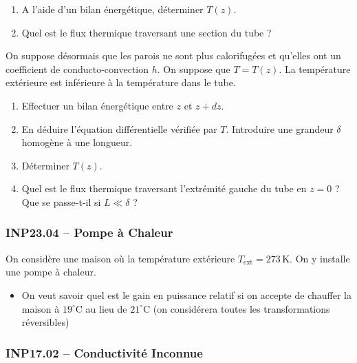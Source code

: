 \begin{enumerate}
\item A l'aide d'un bilan énergétique, déterminer $T(z)$.
\item Quel est le flux thermique traversant une section du tube ?
\end{enumerate}

On suppose désormais que les parois ne sont plus calorifugées et qu'elles ont un coefficient de conducto-convection $h$. On suppose que $T = T(z)$. La température extérieure est inférieure à la température dans le tube.

\begin{enumerate}[resume]
\item Effectuer un bilan énergétique entre $z$ et $z + dz$.
\item En déduire l'équation différentielle vérifiée par $T$. Introduire une grandeur $\delta$ homogène à une longueur.
\item Déterminer $T(z)$.
\item Quel est le flux thermique traversant l'extrémité gauche du tube en $z = 0$ ? Que se passe-t-il si $L \ll \delta$ ?
\end{enumerate}

\newpage
\subsubsection*{INP23.04 -- Pompe à Chaleur }

On considère une maison où la température extérieure $T_{\text{ext}} = 273\,\text{K}$. On y installe une pompe à chaleur.

\begin{itemize}[label=\textbullet]
\item On veut savoir quel est le gain en puissance relatif si on accepte de chauffer la maison à $19^\circ\text{C}$ au lieu de $21^\circ\text{C}$ (on considérera toutes les transformations réversibles)
\end{itemize}


\subsubsection*{INP17.02 -- Conductivité Inconnue  \corrige}

\begin{center}
\end{center}

